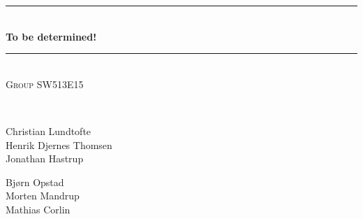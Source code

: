 \documentclass[pdftex,12pt,a4paper]{report}
\newcommand{\HRule}{\rule{\linewidth}{0.5mm}}
\begin{document}
\begin{titlepage}
\begin{center}


\HRule \\[0.4cm]
{ \huge \bfseries To be determined!\\[0.4cm] }

\HRule \\[1.5cm]

\textsc{Group SW513E15}

\begin{figure}[!h]
	\centering
\end{figure}

\textsc{\Large }\\[0.5cm]

\begin{minipage}{0.4\textwidth}
\begin{flushleft} \large
Christian Lundtofte\\
Henrik Djernes Thomsen\\
Jonathan Hastrup\\
\end{flushleft}
\end{minipage}
\begin{minipage}{0.4\textwidth}
\begin{flushright} \large
Bjørn Opstad\\
Morten Mandrup\\
Mathias Corlin
\end{flushright}
\end{minipage}

\vfill

\end{center}
\end{titlepage}
\end{document}
